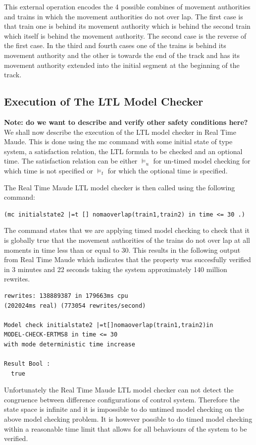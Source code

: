 This external operation encodes the 4 possible combines of movement authorities and trains in which the movement authorities do not over lap.  The first case is that train one is behind its movement authority which is behind the second train which itself is behind the movement authority. The second case is the reverse of the first case. In the third and fourth cases  one of the trains is behind its movement authority and the other is towards the end of the track and has its movement authority extended into the initial segment at the beginning of the track.

\subsection{Execution of The LTL Model Checker}
\textbf{Note: do we want to describe and verify other safety conditions here?}
We shall now describe the execution of the LTL model checker in Real Time Maude. This is done using the mc command with some initial state of type system, a satisfaction relation, the LTL formula to be checked and an optional time. The satisfaction relation can be either $\models_u$ for un-timed model checking for which time is not specified or $\models_t$ for which the optional time is specified.

The Real Time Maude LTL model checker is then called using the following command:

\begin{center}
\texttt{(mc initialstate2 |=t [] nomaoverlap(train1,train2) in time <= 30 .)}
\end{center}
The command states that we are applying timed model checking to check that it is globally true that the movement authorities of the trains do not over lap at all moments in time less than or equal to 30. This results in the following output from Real Time Maude which indicates that the property was succesfully verified in 3 minutes and 22 seconds taking the system approximately 140 million rewrites.
\begin{lstlisting}[caption = No overlapping movement authorities model checking result]
rewrites: 138889387 in 179663ms cpu 
(202024ms real) (773054 rewrites/second)

Model check initialstate2 |=t[]nomaoverlap(train1,train2)in 
MODEL-CHECK-ERTMS8 in time <= 30 
with mode deterministic time increase

Result Bool :
  true
\end{lstlisting}

Unfortunately the Real Time Maude LTL model checker can not detect the congruence between difference configurations of control system. Therefore the state space is infinite and it is impossible to do untimed model checking on the above model checking problem. It is however possible to do timed model checking within a reasonable time limit that allows for all behaviours of the system to be verified.

